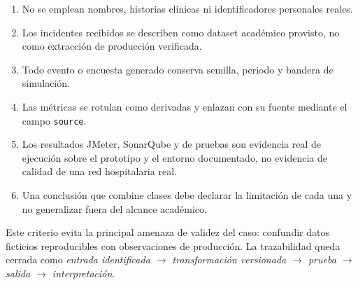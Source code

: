 \begin{enumerate}
  \item No se emplean nombres, historias clínicas ni identificadores personales reales.
  \item Los incidentes recibidos se describen como dataset académico provisto, no como extracción de producción verificada.
  \item Todo evento o encuesta generado conserva semilla, periodo y bandera de simulación.
  \item Las métricas se rotulan como derivadas y enlazan con su fuente mediante el campo \texttt{source}.
  \item Los resultados JMeter, SonarQube y de pruebas son evidencia real de ejecución sobre el prototipo y el entorno documentado, no evidencia de calidad de una red hospitalaria real.
  \item Una conclusión que combine clases debe declarar la limitación de cada una y no generalizar fuera del alcance académico.
\end{enumerate}

Este criterio evita la principal amenaza de validez del caso: confundir datos ficticios reproducibles con observaciones de producción. La trazabilidad queda cerrada como \emph{entrada identificada $\rightarrow$ transformación versionada $\rightarrow$ prueba $\rightarrow$ salida $\rightarrow$ interpretación}.
